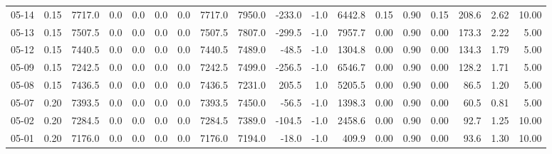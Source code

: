 \begin{threeparttable}
{\begin{tabular}{lrrrrrrrrrrrrrrrrr}
  05-14 &     0.15 & 7717.0 &               0.0 &               0.0 &                0.0 &                0.0 & 7717.0 & 7950.0 &     -233.0 &                     -1.0 &              6442.8 &       0.15 &      0.90 &           0.15 &            208.6 &            2.62 &                  10.00 \\
  05-13 &     0.15 & 7507.5 &               0.0 &               0.0 &                0.0 &                0.0 & 7507.5 & 7807.0 &     -299.5 &                     -1.0 &              7957.7 &       0.00 &      0.90 &           0.00 &            173.3 &            2.22 &                   5.00 \\
  05-12 &     0.15 & 7440.5 &               0.0 &               0.0 &                0.0 &                0.0 & 7440.5 & 7489.0 &      -48.5 &                     -1.0 &              1304.8 &       0.00 &      0.90 &           0.00 &            134.3 &            1.79 &                   5.00 \\
  05-09 &     0.15 & 7242.5 &               0.0 &               0.0 &                0.0 &                0.0 & 7242.5 & 7499.0 &     -256.5 &                     -1.0 &              6546.7 &       0.00 &      0.90 &           0.00 &            128.2 &            1.71 &                   5.00 \\
  05-08 &     0.15 & 7436.5 &               0.0 &               0.0 &                0.0 &                0.0 & 7436.5 & 7231.0 &      205.5 &                      1.0 &              5205.5 &       0.00 &      0.90 &           0.00 &             86.5 &            1.20 &                   5.00 \\
  05-07 &     0.20 & 7393.5 &               0.0 &               0.0 &                0.0 &                0.0 & 7393.5 & 7450.0 &      -56.5 &                     -1.0 &              1398.3 &       0.00 &      0.90 &           0.00 &             60.5 &            0.81 &                   5.00 \\
  05-02 &     0.20 & 7284.5 &               0.0 &               0.0 &                0.0 &                0.0 & 7284.5 & 7389.0 &     -104.5 &                     -1.0 &              2458.6 &       0.00 &      0.90 &           0.00 &             92.7 &            1.25 &                  10.00 \\
  05-01 &     0.20 & 7176.0 &               0.0 &               0.0 &                0.0 &                0.0 & 7176.0 & 7194.0 &      -18.0 &                     -1.0 &               409.9 &       0.00 &      0.90 &           0.00 &             93.6 &            1.30 &                  10.00 \\

\end{tabular}}
\end{threeparttable}
